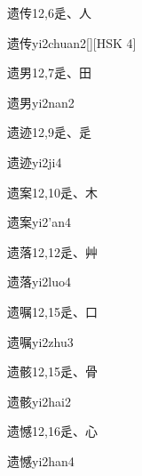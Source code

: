 \begin{entry}{遗传}{12,6}{⾡、⼈}
  \begin{phonetics}{遗传}{yi2chuan2}[][HSK 4]
  \end{phonetics}
\end{entry}

\begin{entry}{遗男}{12,7}{⾡、⽥}
  \begin{phonetics}{遗男}{yi2nan2}
  \end{phonetics}
\end{entry}

\begin{entry}{遗迹}{12,9}{⾡、⾡}
  \begin{phonetics}{遗迹}{yi2ji4}
  \end{phonetics}
\end{entry}

\begin{entry}{遗案}{12,10}{⾡、⽊}
  \begin{phonetics}{遗案}{yi2'an4}
  \end{phonetics}
\end{entry}

\begin{entry}{遗落}{12,12}{⾡、⾋}
  \begin{phonetics}{遗落}{yi2luo4}
  \end{phonetics}
\end{entry}

\begin{entry}{遗嘱}{12,15}{⾡、⼝}
  \begin{phonetics}{遗嘱}{yi2zhu3}
  \end{phonetics}
\end{entry}

\begin{entry}{遗骸}{12,15}{⾡、⾻}
  \begin{phonetics}{遗骸}{yi2hai2}
  \end{phonetics}
\end{entry}

\begin{entry}{遗憾}{12,16}{⾡、⼼}
  \begin{phonetics}{遗憾}{yi2han4}
  \end{phonetics}
\end{entry}

